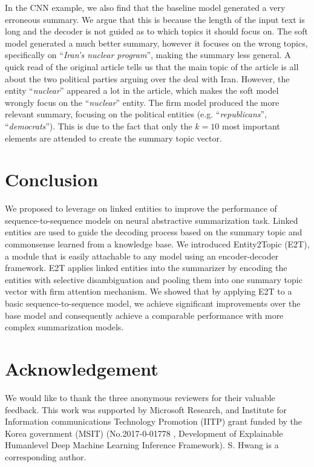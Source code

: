 \documentclass[11pt,a4paper]{article}
\begin{document}
In the CNN example, we also find that the baseline model generated a very erroneous summary. We argue that this is because the length of the input text is long and the decoder is not guided as to which topics it should focus on.
The soft model generated a much better summary, however it focuses on the wrong topics, specifically on ``\textit{Iran's nuclear program}'', making the summary less general.
A quick read of the original article tells us that the main topic of the article is all about the two political parties arguing over the deal with Iran. However, the entity ``\textit{nuclear}'' appeared a lot in the article, which makes the soft model wrongly focus on the ``\textit{nuclear}'' entity.
The firm model produced the more relevant summary, focusing on the political entities (e.g. ``\textit{republicans}'', ``\textit{democrats}''). This is due to the fact that only the $k=10$ most important elements are attended to create the summary topic vector.

\section{Conclusion}

We proposed to leverage on linked entities to improve the performance of sequence-to-sequence models on neural abstractive summarization task. Linked entities are used to guide the decoding process based on the summary topic and commonsense learned from a knowledge base. We introduced Entity2Topic (E2T), a module that is easily attachable to any 
model using an encoder-decoder framework. E2T applies linked entities into the summarizer by encoding the entities with selective disambiguation and pooling them into one summary topic vector with firm attention mechanism. We showed that by applying E2T to a basic sequence-to-sequence model, we achieve significant improvements over the base model and consequently achieve a comparable performance with more complex summarization models.

\section*{Acknowledgement}
We would like to thank the three anonymous reviewers for their valuable feedback.
This work was supported by Microsoft Research, and Institute for Information communications Technology Promotion (IITP) grant funded by the Korea government (MSIT) (No.2017-0-01778 , Development of Explainable Humanlevel Deep Machine Learning Inference Framework). S. Hwang is a corresponding author.



\end{document}
